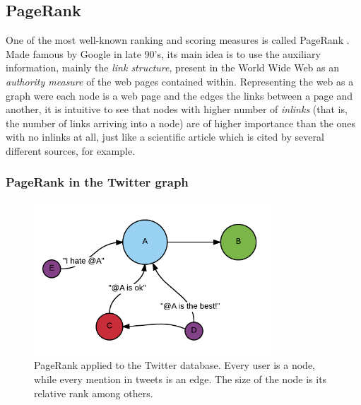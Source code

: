 \subsection{PageRank}

One of the most well-known ranking and scoring measures is called PageRank
\cite{pr}. Made famous by Google in late 90's, its main idea is to use the
auxiliary information, mainly the \emph{link structure}, present in the World
Wide Web as an \emph{authority measure} of the web pages contained within.
Representing the web as a graph were each node is a web page and the edges the
links between a page and another, it is intuitive to see that nodes with higher
number of \emph{inlinks} (that is, the number of links arriving into a node) are
of higher importance than the ones with no inlinks at all, just like a
scientific article which is cited by several different sources, for example.



\subsubsection{PageRank in the Twitter graph}

\begin{figure}[H]
\centering
\includegraphics[width=3.5in,natwidth=534,natheight=345]{images/PageRank.png}
\caption{PageRank applied to the Twitter database. Every user is a node, while every mention in tweets is an edge. The size of the node is its relative rank among others.}
\label{fig:pagerank}
\end{figure}



